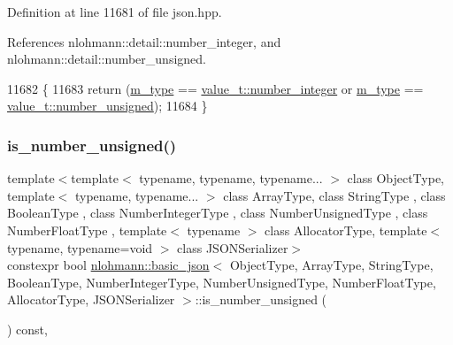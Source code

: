 Definition at line 11681 of file json.\+hpp.



References nlohmann\+::detail\+::number\+\_\+integer, and nlohmann\+::detail\+::number\+\_\+unsigned.


\begin{DoxyCode}
11682     \{
11683         \textcolor{keywordflow}{return} (\hyperlink{classnlohmann_1_1basic__json_a91990b60d7d4d67968a2c1db677536e7}{m\_type} == \hyperlink{namespacenlohmann_1_1detail_a1ed8fc6239da25abcaf681d30ace4985a5763da164f8659d94a56e29df64b4bcc}{value\_t::number\_integer} or 
      \hyperlink{classnlohmann_1_1basic__json_a91990b60d7d4d67968a2c1db677536e7}{m\_type} == \hyperlink{namespacenlohmann_1_1detail_a1ed8fc6239da25abcaf681d30ace4985adce7cc8ec29055c4158828921f2f265e}{value\_t::number\_unsigned});
11684     \}
\end{DoxyCode}
\mbox{\label{classnlohmann_1_1basic__json_abc7378cba0613a78b9aad1c8e7044bb0}} 
\subsubsection{\texorpdfstring{is\+\_\+number\+\_\+unsigned()}{is\_number\_unsigned()}}
{\footnotesize\ttfamily template$<$template$<$ typename, typename, typename... $>$ class Object\+Type, template$<$ typename, typename... $>$ class Array\+Type, class String\+Type , class Boolean\+Type , class Number\+Integer\+Type , class Number\+Unsigned\+Type , class Number\+Float\+Type , template$<$ typename $>$ class Allocator\+Type, template$<$ typename, typename=void $>$ class J\+S\+O\+N\+Serializer$>$ \\
constexpr bool \hyperlink{classnlohmann_1_1basic__json}{nlohmann\+::basic\+\_\+json}$<$ Object\+Type, Array\+Type, String\+Type, Boolean\+Type, Number\+Integer\+Type, Number\+Unsigned\+Type, Number\+Float\+Type, Allocator\+Type, J\+S\+O\+N\+Serializer $>$\+::is\+\_\+number\+\_\+unsigned (\begin{DoxyParamCaption}{ }\end{DoxyParamCaption}) const\hspace{0.3cm}{\ttfamily [inline]}, {\ttfamily [noexcept]}}



